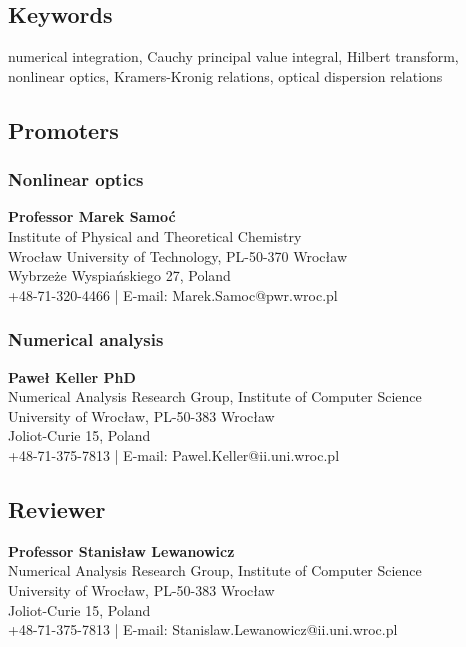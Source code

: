 \documentclass[12pt,twoside,a4paper]{article}
\numberwithin{equation}{subsection}
\numberwithin{figure}{subsection}
\begin{document}
\subsection*{Keywords} \label{chap:abstract_keywords}
numerical integration, Cauchy principal value integral, Hilbert transform, nonlinear optics, Kramers-Kronig relations, optical dispersion
relations

\subsection*{Promoters} \label{chap:abstract_promotors}

\subsubsection*{Nonlinear optics}

\textbf{Professor Marek Samoć} \\
Institute of Physical and Theoretical Chemistry \\
Wrocław University of Technology, PL-50-370 Wrocław \\
Wybrzeże Wyspiańskiego 27, Poland \\
+48-71-320-4466 | E-mail: Marek.Samoc@pwr.wroc.pl

\subsubsection*{Numerical analysis}

\textbf{Paweł Keller PhD} \\
Numerical Analysis Research Group, Institute of Computer Science \\
University of Wrocław, PL-50-383 Wrocław \\
Joliot-Curie 15, Poland \\
+48-71-375-7813 | E-mail: Pawel.Keller@ii.uni.wroc.pl


\subsection*{Reviewer}  \label{chap:abstract_reviewer}

\textbf{Professor Stanisław Lewanowicz} \\
Numerical Analysis Research Group, Institute of Computer Science \\
University of Wrocław, PL-50-383 Wrocław \\
Joliot-Curie 15, Poland \\
+48-71-375-7813 | E-mail: Stanislaw.Lewanowicz@ii.uni.wroc.pl
\end{document}

